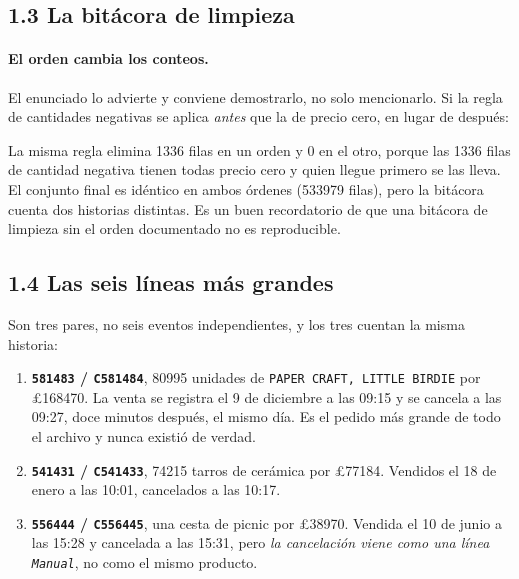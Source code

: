 \documentclass[11pt]{article}
\newcommand{\gbp}{\pounds}
\begin{document}
\subsection{1.3 La bit\'acora de limpieza}



\paragraph{El orden cambia los conteos.} El enunciado lo advierte y conviene
demostrarlo, no solo mencionarlo. Si la regla de cantidades negativas se
aplica \emph{antes} que la de precio cero, en lugar de despu\'es:



La misma regla elimina \num{1336} filas en un orden y \num{0} en el otro,
porque las \num{1336} filas de cantidad negativa tienen todas precio cero y
quien llegue primero se las lleva. El conjunto final es id\'entico en ambos
\'ordenes (\num{533979} filas), pero la bit\'acora cuenta dos historias
distintas. Es un buen recordatorio de que una bit\'acora de limpieza sin el
orden documentado no es reproducible.

\subsection{1.4 Las seis l\'ineas m\'as grandes}



Son tres pares, no seis eventos independientes, y los tres cuentan la misma
historia:

\begin{enumerate}[leftmargin=1.5em]
  \item \textbf{\texttt{581483} / \texttt{C581484}}, \num{80995} unidades de
  \texttt{PAPER CRAFT, LITTLE BIRDIE} por \gbp\num{168470}. La venta se
  registra el 9 de diciembre a las 09:15 y se cancela a las 09:27, doce
  minutos despu\'es, el mismo d\'ia. Es el pedido m\'as grande de todo el
  archivo y nunca existi\'o de verdad.
  \item \textbf{\texttt{541431} / \texttt{C541433}}, \num{74215} tarros de
  cer\'amica por \gbp\num{77184}. Vendidos el 18 de enero a las 10:01,
  cancelados a las 10:17.
  \item \textbf{\texttt{556444} / \texttt{C556445}}, una cesta de picnic por
  \gbp\num{38970}. Vendida el 10 de junio a las 15:28 y cancelada a las
  15:31, pero \emph{la cancelaci\'on viene como una l\'inea
  \texttt{Manual}}, no como el mismo producto.
\end{enumerate}
\end{document}
